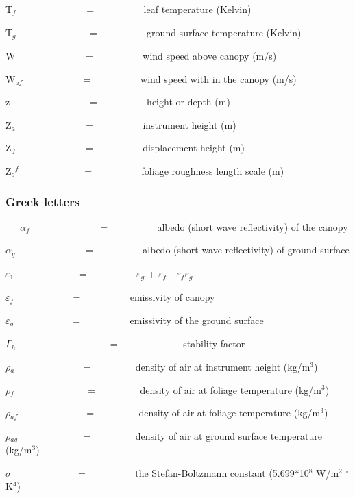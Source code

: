 T\emph{\(_{f}\)}~~~~~~~~~~~~~~ = ~~~~~~~~~ leaf temperature (Kelvin)

T\(_{g}\) ~~~~~~~~~~~~~~ = ~~~~~~~~~ ground surface temperature (Kelvin)

W~~~~~~~~~~~~~~ = ~~~~~~~~~ wind speed above canopy (m/s)

W\(_{af}\)~~~~~~~~~~~~ = ~~~~~~~~~ wind speed with in the canopy (m/s)

z~~~~~~~~~~~~~~~~ = ~~~~~~~~~ height or depth (m)

Z\(_{a}\)~~~~~~~~~~~~~~ = ~~~~~~~~~ instrument height (m)

Z\(_{d}\)~~~~~~~~~~~~~~ = ~~~~~~~~~ displacement height (m)

Z\(_{o}\)\(^{f}\)~~~~~~~~~~~~~ = ~~~~~~~~~ foliage roughness length scale (m)

\subsubsection{Greek letters}\label{greek-letters-000}

~~~\(\alpha\)\(_{f}\)~~~~~~~~~~~~~~ = ~~~~~~~~~ albedo (short wave reflectivity) of the canopy

\(\alpha\)\(_{g}\)~~~~~~~~~~~~~~ = ~~~~~~~~~ albedo (short wave reflectivity) of ground surface

\(\varepsilon\)\(_{1}\)~~~~~~~~~~~~~ = ~~~~~~~~~ \(\varepsilon\)\(_{g}\) + \(\varepsilon\)\(_{f}\)  - \(\varepsilon\)\(_{f}\)\(\varepsilon\)\(_{g}\)

\(\varepsilon\)\(_{f}\) ~~~~~~~~~~~ = ~~~~~~~~~ emissivity of canopy

\(\varepsilon\)\(_{g}\) ~~~~~~~~~~~ = ~~~~~~~~~ emissivity of the ground surface

\(\Gamma\)\(_{h}\)~~~~~~~~~~~~~~~~~~~ = ~~~~~~~~~~~~~stability factor

\(\rho\)\(_{a}\)~ ~~~~~~~~~~~~ = ~~~~~~~~ density of air at instrument height (kg/m\(^{3}\))

\(\rho\)\(_{f}\)~ ~~~~~~~~~~~~~ = ~~~~~~~~ density of air at foliage temperature (kg/m\(^{3}\))

\(\rho\)\(_{af}\)~ ~~~~~~~~~~~~ = ~~~~~~~~ density of air at foliage temperature (kg/m\(^{3}\))

\(\rho\)\(_{ag}\)~~~~~~~~~~~~~ = ~~~~~~~~ density of air at ground surface temperature (kg/m\(^{3}\))

\(\sigma\) ~ ~~~~~~~~~~~ = ~~~~~~~~~ the Stefan-Boltzmann constant (5.699*10\(^{8}\) W/m\(^{2}\) $^{\circ}$K\(^{4}\))

